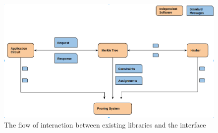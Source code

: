 \begin{figure}[h!]
	\includegraphics[width=\linewidth]{routine.png}
	\caption{The flow of interaction between existing libraries and the interface}
	\label{flow}
\end{figure}